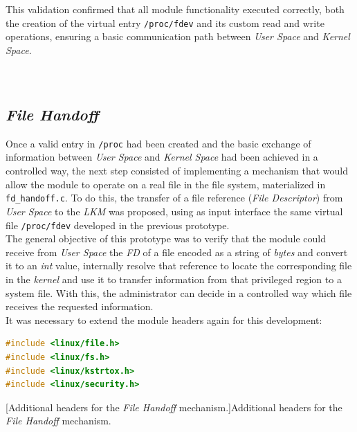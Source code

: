 This validation confirmed that all module functionality executed correctly, both the creation of the virtual entry \texttt{/proc/fdev} and its custom read and write operations, ensuring a basic communication path between \textit{User Space} and \textit{Kernel Space}.\\\\

\

\subsection{\textit{File Handoff}}
\label{sec:proto-file-handoff}

Once a valid entry in \texttt{/proc} had been created and the basic exchange of information between \textit{User Space} and \textit{Kernel Space} had been achieved in a controlled way, the next step consisted of implementing a mechanism that would allow the module to operate on a real file in the file system, materialized in \verb|fd_handoff.c|.
To do this, the transfer of a file reference (\textit{File Descriptor}) from \textit{User Space} to the \textit{LKM} was proposed, using as input interface the same virtual file \texttt{/proc/fdev} developed in the previous prototype.\\

The general objective of this prototype was to verify that the module could receive from \textit{User Space} the \textit{FD} of a file encoded as a string of \textit{bytes} and convert it to an \textit{int} value, internally resolve that reference to locate the corresponding file in the \textit{kernel} and use it to transfer information from that privileged region to a system file.
With this, the administrator can decide in a controlled way which file receives the requested information.\\

It was necessary to extend the module headers again for this development:

\begin{lstlisting}[language=C]
#include <linux/file.h>
#include <linux/fs.h>
#include <linux/kstrtox.h>
#include <linux/security.h>
\end{lstlisting}
\captionsetup{type=code,justification=centering,singlelinecheck=false}
[Additional headers for the \textit{File Handoff} mechanism.]{Additional headers for the \textit{File Handoff} mechanism.}
\label{cod:file_handoff_headers}
\vspace{\baselineskip}


